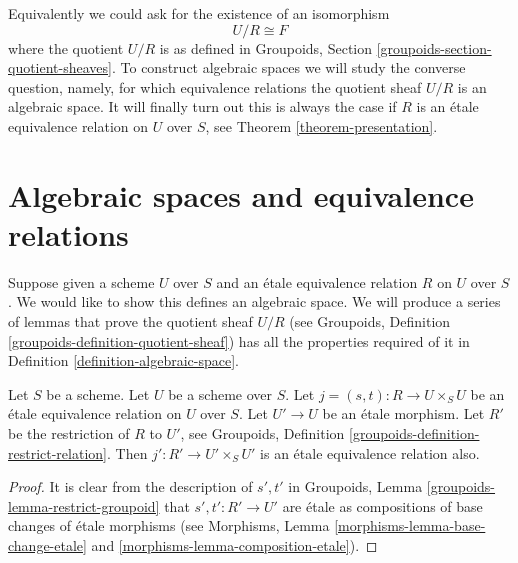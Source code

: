 \noindent
Equivalently we could ask for the existence of an isomorphism
$$
U/R \cong F
$$
where the quotient $U/R$ is as defined in
Groupoids, Section \ref{groupoids-section-quotient-sheaves}.
To construct algebraic spaces we will study the converse question, namely,
for which equivalence relations the quotient sheaf $U/R$ is an algebraic space.
It will finally turn out this is always the case if $R$ is an \'etale
equivalence relation on $U$ over $S$, see Theorem \ref{theorem-presentation}.





























\section{Algebraic spaces and equivalence relations}
\label{section-spaces-from-equivalence-relations}

\noindent
Suppose given a scheme $U$ over $S$
and an \'etale equivalence relation $R$ on $U$ over $S$.
We would like to show this defines an algebraic space.
We will produce a series of lemmas that prove the quotient sheaf $U/R$
(see Groupoids, Definition \ref{groupoids-definition-quotient-sheaf})
has all the properties required
of it in Definition \ref{definition-algebraic-space}.

\begin{lemma}
\label{lemma-pullback-etale-equivalence-relation}
Let $S$ be a scheme. Let $U$ be a scheme over $S$.
Let $j = (s, t) : R \to U \times_S U$
be an \'etale equivalence relation on $U$ over $S$.
Let $U' \to U$ be an \'etale morphism.
Let $R'$ be the restriction of $R$ to $U'$, see
Groupoids, Definition \ref{groupoids-definition-restrict-relation}.
Then $j' : R' \to U' \times_S U'$ is an \'etale equivalence
relation also.
\end{lemma}

\begin{proof}
It is clear from the description of $s', t'$ in
Groupoids, Lemma \ref{groupoids-lemma-restrict-groupoid}
that $s' , t' : R' \to U'$ are \'etale
as compositions of base changes of \'etale morphisms
(see Morphisms, Lemma \ref{morphisms-lemma-base-change-etale}
and \ref{morphisms-lemma-composition-etale}).
\end{proof}

